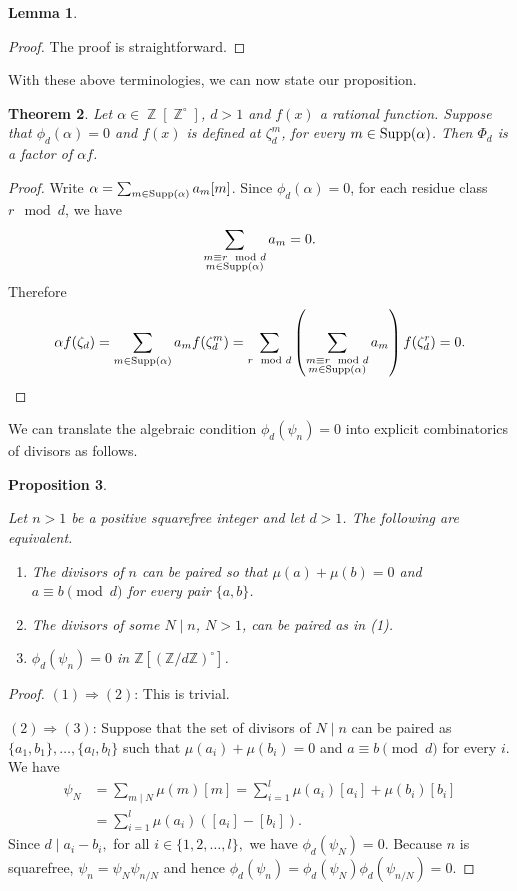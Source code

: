 \documentclass[12t,a4paper]{amsart}
\newtheorem{thm}{Theorem}[section]
\newtheorem{prop}[thm]{Proposition}
\newtheorem{lem}[thm]{Lemma}
\theoremstyle{definition}
\DeclareMathOperator{\Z}{\mathbb{Z}}
\DeclareMathOperator{\supp}{{\rm Supp}}
\numberwithin{equation}{section}
\begin{document}
{\begin{lem}
\end{lem}
\begin{proof} The proof is straightforward.
\end{proof}

With these above terminologies, we can now state our proposition. 

\begin{thm} \label{prop:0mod-rational}
    Let $\alpha\in  \Z[\Z^\circ]$, $d>1$ and $f(x)$ a rational function. Suppose that $\phi_d(\alpha)=0$ and $f(x)$ is defined at $\zeta_d^m$, for every $m \in \supp(\alpha)$. Then $\Phi_d$ is a factor of $\alpha f$.
\end{thm}
\begin{proof} Write $\alpha=\sum_{m\in \supp(\alpha) } a_m[m]$. Since     $\phi_d(\alpha)=0$, for each residue class $r\mod d$, we have 
\[\sum_{\substack{m\equiv r\mod d\\ m\in \supp(\alpha)} } a_m=0.\] 
Therefore
\[
\alpha f(\zeta_d) = \sum_{m\in \supp(\alpha) } a_m f(\zeta_d^m) =\sum_{r\mod d} \left(\sum_{\substack{m\equiv r\mod d\\ m\in \supp(\alpha)} } a_m\right) f(\zeta_d^r)=0.
\qedhere
\]
\end{proof}
We can translate the algebraic condition  $\phi_d(\psi_n)=0$ into explicit combinatorics of divisors as follows.
\begin{prop} \label{prop:paired-1}
   
Let \(n>1\) be a positive squarefree integer and let \(d>1\). The following are equivalent.

\begin{enumerate}
     \item The divisors of \(n\) can be paired so that
      \(\mu(a)+\mu(b)=0\) and \(a\equiv b\pmod d\) for every pair $\{a,b\}$.
    \item The divisors of some $N\mid n$, $N>1$, can be paired as in (1).
            \item \(\phi_d(\psi_n)=0\) in \(\mathbb Z[(\mathbb Z/d\mathbb Z)^\circ]\).
\end{enumerate}
\end{prop}
\begin{proof}
$(1)\Rightarrow (2)$: This is trivial.

$(2)\Rightarrow (3)$: Suppose that the set of divisors of $N\mid n$ can be paired as $\{a_1,b_1\},\ldots, \{a_l,b_l\}$ such that $\mu(a_i)+\mu(b_i)=0$ and  \(a\equiv b\pmod d\) for every $i$. We have
    \begin{align*}
        \psi_N
&= \sum_{m \mid N} \mu(m) [m] =  \sum_{i=1}^{l}
\mu(a_i)[a_i]+ \mu(b_i)[b_i]
\\
&=  \sum_{i=1}^{l}
\mu(a_i) ([a_i]-[b_i]).
    \end{align*}
    Since $d \mid a_i-b_i,$ for all $i \in \{1,2,\ldots,l\},$ we have $\phi_d(\psi_N)= 0.$ Because $n$ is squarefree, $\psi_n = \psi_N \psi_{n/N}$ and hence $\phi_d(\psi_n)=\phi_d(\psi_N)\phi_d(\psi_{n/N})=0$.


\end{proof}}
\end{document}
